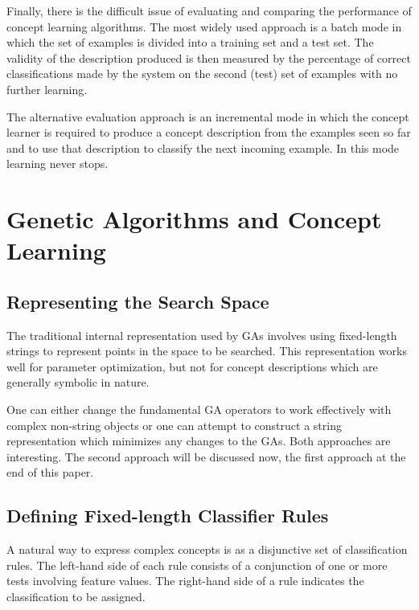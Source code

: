 \documentclass[12pt]{book}
\begin{document}
Finally, there is the difficult issue of evaluating and comparing the performance of concept learning algorithms. The most widely used approach is a batch mode in which the set of examples is divided into a training set and a test set. The validity of the description produced is then measured by the percentage of correct classifications made by the system on the second (test) set of examples with no further learning.

The alternative evaluation approach is an incremental mode in which the concept learner is required to produce a concept description from the examples seen so far and to use that description to classify the next incoming example. In this mode learning never stops.

\section{Genetic Algorithms and Concept Learning}

\subsection{Representing the Search Space}
The traditional internal representation used by GAs involves using fixed-length strings to represent points in the space to be searched. This representation works well for parameter optimization, but not for concept descriptions which are generally symbolic in nature.

One can either change the fundamental GA operators to work effectively with complex non-string objects or one can attempt to construct a string representation which minimizes any changes to the GAs. Both approaches are interesting. The second approach will be discussed now, the first approach at the end of this paper.

\subsection{Defining Fixed-length Classifier Rules}
A natural way to express complex concepts is as a disjunctive set of classification rules. The left-hand side of each rule consists of a conjunction of one or more tests involving feature values. The right-hand side of a rule indicates the classification to be assigned.
\end{document}
